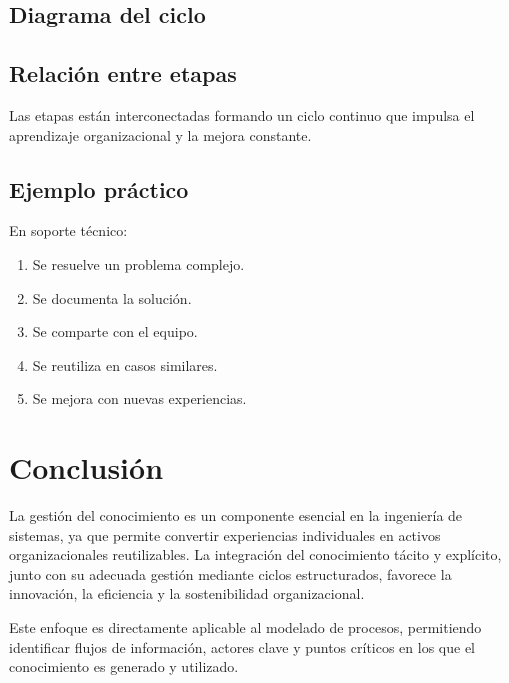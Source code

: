 \documentclass[12pt,a4paper]{article}
\begin{document}
\subsection{Diagrama del ciclo}
\begin{center}
\end{center}



\subsection{Relación entre etapas}
Las etapas están interconectadas formando un ciclo continuo que impulsa el aprendizaje organizacional y la mejora constante.

\subsection{Ejemplo práctico}
En soporte técnico:
\begin{enumerate}
    \item Se resuelve un problema complejo.
    \item Se documenta la solución.
    \item Se comparte con el equipo.
    \item Se reutiliza en casos similares.
    \item Se mejora con nuevas experiencias.
\end{enumerate}

\section{Conclusión}
La gestión del conocimiento es un componente esencial en la ingeniería de sistemas, ya que permite convertir experiencias individuales en activos organizacionales reutilizables. La integración del conocimiento tácito y explícito, junto con su adecuada gestión mediante ciclos estructurados, favorece la innovación, la eficiencia y la sostenibilidad organizacional.

Este enfoque es directamente aplicable al modelado de procesos, permitiendo identificar flujos de información, actores clave y puntos críticos en los que el conocimiento es generado y utilizado.
\end{document}
